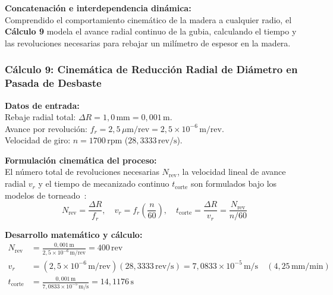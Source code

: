 \documentclass[12pt,a4paper]{article}
\begin{document}
\noindent\textbf{Concatenación e interdependencia dinámica:}\\
Comprendido el comportamiento cinemático de la madera a cualquier radio, el \textbf{Cálculo 9} modela el avance radial continuo de la gubia, calculando el tiempo y las revoluciones necesarias para rebajar un milímetro de espesor en la madera.
\vspace{12pt}

\subsubsection{Cálculo 9: Cinemática de Reducción Radial de Diámetro en Pasada de Desbaste}

\noindent\textbf{Datos de entrada:}\\
Rebaje radial total: $\Delta R = 1{,}0\,\text{mm} = 0{,}001\,\text{m}$.\\
Avance por revolución: $f_r = 2{,}5\,\mu\text{m/rev} = 2{,}5\times 10^{-6}\,\text{m/rev}$.\\
Velocidad de giro: $n = 1700\,\text{rpm}$ ($28{,}3333\,\text{rev/s}$).
\vspace{6pt}

\noindent\textbf{Formulación cinemática del proceso:}\\
El número total de revoluciones necesarias $N_{\text{rev}}$, la velocidad lineal de avance radial $v_r$ y el tiempo de mecanizado continuo $t_{\text{corte}}$ son formulados bajo los modelos de torneado~\cite{groover2007, urinov2024}:
\begin{equation}
    N_{\text{rev}} = \frac{\Delta R}{f_r}, \quad v_r = f_r \left(\frac{n}{60}\right), \quad t_{\text{corte}} = \frac{\Delta R}{v_r} = \frac{N_{\text{rev}}}{n/60}
\end{equation}
\vspace{6pt}

\noindent\textbf{Desarrollo matemático y cálculo:}
\begin{align}
    N_{\text{rev}} &= \frac{0{,}001\,\text{m}}{2{,}5\times 10^{-6}\,\text{m/rev}} = \boxed{400\,\text{rev}} \\[6pt]
    v_r &= (2{,}5 \times 10^{-6}\,\text{m/rev})(28{,}3333\,\text{rev/s}) = \boxed{7{,}0833 \times 10^{-5}\,\text{m/s}} \quad (4{,}25\,\text{mm/min}) \\[6pt]
    t_{\text{corte}} &= \frac{0{,}001\,\text{m}}{7{,}0833 \times 10^{-5}\,\text{m/s}} = \boxed{14{,}1176\,\text{s}}
\end{align}
\vspace{6pt}
\end{document}
